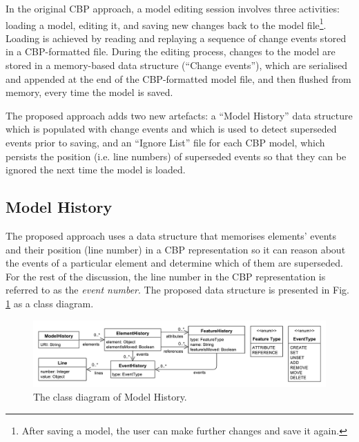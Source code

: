 \documentclass[12pt, a4paper]{report} \usepackage[titletoc]{appendix}
\begin{document}
In the original CBP approach, a model editing session involves three activities: loading a model, editing it, and saving new changes back to the model file\footnote{After saving a model, the user can make further changes and save it again.}. Loading is achieved by reading and replaying a sequence of change events stored in a CBP-formatted file. During the editing process, changes to the model are stored in a memory-based data structure (``Change events''), which are serialised and appended at the end of the CBP-formatted model file, and then flushed from memory, every time the model is saved.

The proposed approach adds two new artefacts: a ``Model History'' data structure which is populated with change events and which is used to detect superseded events prior to saving, and an ``Ignore List'' file for each CBP model, which persists the position (i.e. line numbers) of superseded events so that they can be ignored the next time the model is loaded.

\subsection{Model History}
\label{subsec:model_history}
The proposed approach uses a data structure that memorises elements' events and their position (line number) in a CBP representation so it can reason about the events of a particular element and determine which of them are superseded. For the rest of the discussion, the line number in the CBP representation is referred to as the \emph{event number}. The proposed data structure is presented in Fig. \ref{fig:object_history} as a class diagram.  

\begin{figure}[ht]
	\centering
	\includegraphics[width=\linewidth]{object_history}
	\caption{The class diagram of Model History.}
	\label{fig:object_history}
\end{figure}
\end{document}
